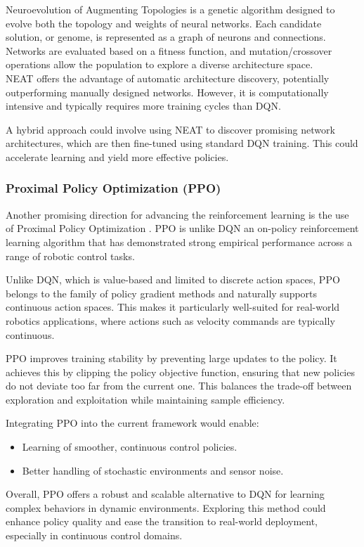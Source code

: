 Neuroevolution of Augmenting Topologies \cite{neat} is a genetic algorithm designed to evolve both the topology and weights of neural networks. Each candidate solution, or genome, is represented as a graph of neurons and connections. Networks are evaluated based on a fitness function, and mutation/crossover operations allow the population to explore a diverse architecture space.\\

NEAT offers the advantage of automatic architecture discovery, potentially outperforming manually designed networks. However, it is computationally intensive and typically requires more training cycles than DQN.

A hybrid approach could involve using NEAT to discover promising network architectures, which are then fine-tuned using standard DQN training. This could accelerate learning and yield more effective policies.

\subsubsection{Proximal Policy Optimization (PPO)}
Another promising direction for advancing the reinforcement learning is the use of Proximal Policy Optimization \cite{ppo}. PPO is unlike DQN an on-policy reinforcement learning algorithm that has demonstrated strong empirical performance across a range of robotic control tasks.

Unlike DQN, which is value-based and limited to discrete action spaces, PPO belongs to the family of policy gradient methods and naturally supports continuous action spaces. This makes it particularly well-suited for real-world robotics applications, where actions such as velocity commands are typically continuous.

PPO improves training stability by preventing large updates to the policy. It achieves this by clipping the policy objective function, ensuring that new policies do not deviate too far from the current one. This balances the trade-off between exploration and exploitation while maintaining sample efficiency.

Integrating PPO into the current framework would enable:
\begin{itemize}
  \item Learning of smoother, continuous control policies.
  \item Better handling of stochastic environments and sensor noise.
\end{itemize}

Overall, PPO offers a robust and scalable alternative to DQN for learning complex behaviors in dynamic environments. Exploring this method could enhance policy quality and ease the transition to real-world deployment, especially in continuous control domains.
